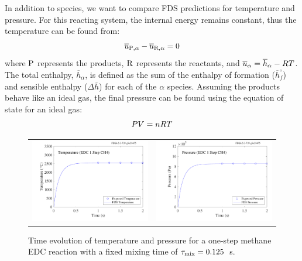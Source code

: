 \documentclass[11pt]{book}
\begin{document}
In addition to species, we want to compare FDS predictions for temperature and pressure. For this reacting system, the internal energy remains constant, thus the temperature can be found from:
\begin{equation}\label{eq:del_u}
\overline{u}_{{\rm P},\alpha} - \overline{u}_{{\rm R},\alpha} = 0
\end{equation}
where ${\rm P}$ represents the products, ${\rm R}$ represents the reactants, and $\overline{u}_{\alpha}=\overline{h}_{\alpha}-R T$. The total enthalpy, $\overline{h}_{\alpha}$, is defined as the sum of the enthalpy of formation ($\overline{h}_{f}^{\circ}$) and sensible enthalpy ($\Delta \overline{h}$) for each of the $\alpha$ species. Assuming the products behave like an ideal gas, the final pressure can be found using the equation of state for an ideal gas:
\begin{equation}\label{eq:ideal_gas}
PV = n R T
\end{equation}
\begin{figure}[h!]
\begin{tabular*}{\textwidth}{lr}
\includegraphics[width=3.2in]{SCRIPT_FIGURES/reactionrate_EDC_flim_1step_CH4_temp} &
\includegraphics[width=3.2in]{SCRIPT_FIGURES/reactionrate_EDC_flim_1step_CH4_pres}
\end{tabular*}
\caption[Temperature and pressure evolution in a 1-step methane EDC reaction]{Time evolution of temperature and pressure for a one-step methane EDC reaction with a fixed mixing time of $\tau_{\rm mix}=0.125$~s.}
\label{fig:EDC_1Step_meth_temppres}
\end{figure}
\end{document}
